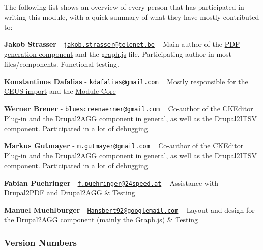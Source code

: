 The following list shows an overview of every person that has participated in writing this module, with a quick summary of what they have mostly contributed to\+:
\begin{DoxyItemize}
\item {\bfseries Jakob Strasser} -\/ \href{mailto:jakob.strasser@telenet.be}{\tt jakob.\+strasser@telenet.\+be} ~\newline
Main author of the \hyperlink{index_CEUS2Drupal}{P\+D\+F generation component} and the \hyperlink{graph_8js}{graph.\+js} file. Participating author in most files/components. Functional testing. 


\item {\bfseries Konstantinos Dafalias} -\/ \href{mailto:kdafalias@gmail.com}{\tt kdafalias@gmail.\+com} ~\newline
Mostly responsible for the \hyperlink{index_CEUS2Drupal}{C\+E\+U\+S import} and the \hyperlink{group___stukowin___module}{Module Core} 


\item {\bfseries Werner Breuer} -\/ \href{mailto:bluescreenwerner@gmail.com}{\tt bluescreenwerner@gmail.\+com} ~\newline
Co-\/author of the \hyperlink{index_plugin}{C\+K\+Editor Plug-\/in} and the \hyperlink{index_Drupal2AGG}{Drupal2\+A\+G\+G} component in general, as well as the \hyperlink{index_Drupal2ITSV}{Drupal2\+I\+T\+S\+V} component. Participated in a lot of debugging. 


\item {\bfseries Markus Gutmayer} -\/ \href{mailto:m.gutmayer@gmail.com}{\tt m.\+gutmayer@gmail.\+com} ~\newline
Co-\/author of the \hyperlink{index_plugin}{C\+K\+Editor Plug-\/in} and the \hyperlink{index_Drupal2AGG}{Drupal2\+A\+G\+G} component in general, as well as the \hyperlink{index_Drupal2ITSV}{Drupal2\+I\+T\+S\+V} component. Participated in a lot of debugging. 


\item {\bfseries Fabian Puehringer} -\/ \href{mailto:f.puehringer@24speed.at}{\tt f.\+puehringer@24speed.\+at} ~\newline
Assistance with \hyperlink{index_Drupal2PDF}{Drupal2\+P\+D\+F} and \hyperlink{index_Drupal2AGG}{Drupal2\+A\+G\+G} \& Testing 


\item {\bfseries Manuel Muehlburger} -\/ \href{mailto:Hansbert92@googlemail.com}{\tt Hansbert92@googlemail.\+com} ~\newline
Layout and design for the \hyperlink{index_Drupal2AGG}{Drupal2\+A\+G\+G} component (mainly the \hyperlink{index_graph}{Graph.\+js}) \& Testing
\end{DoxyItemize}\hypertarget{index_versionnumbers}{}\subsubsection{Version Numbers}\label{index_versionnumbers}
